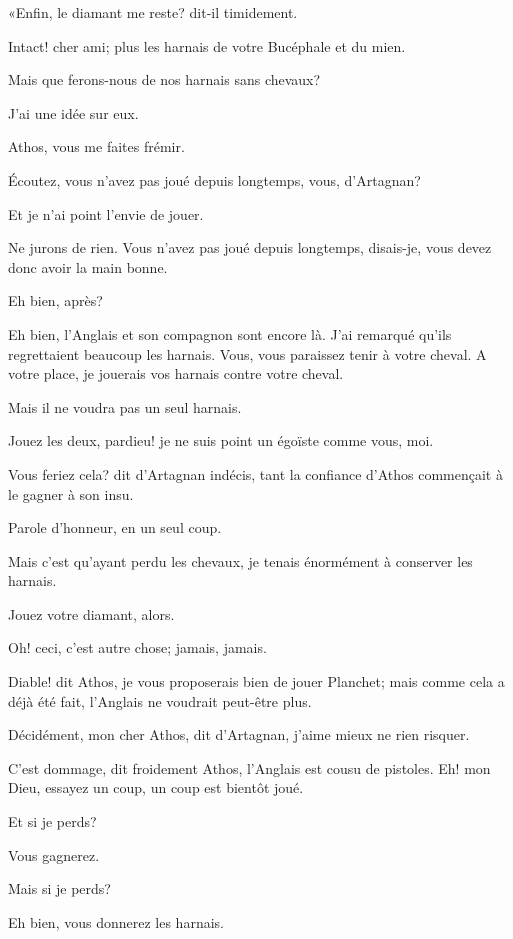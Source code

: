 «Enfin, le diamant me reste? dit-il timidement. 

\speak  Intact! cher ami; plus les harnais de votre Bucéphale et du mien. 

\speak  Mais que ferons-nous de nos harnais sans chevaux? 

\speak  J'ai une idée sur eux. 

\speak  Athos, vous me faites frémir. 

\speak  Écoutez, vous n'avez pas joué depuis longtemps, vous, d'Artagnan? 

\speak  Et je n'ai point l'envie de jouer. 

\speak  Ne jurons de rien. Vous n'avez pas joué depuis longtemps, disais-je, vous devez donc avoir la main bonne. 

\speak  Eh bien, après? 

\speak  Eh bien, l'Anglais et son compagnon sont encore là. J'ai remarqué qu'ils regrettaient beaucoup les harnais. Vous, vous paraissez tenir à votre cheval. A votre place, je jouerais vos harnais contre votre cheval. 

\speak  Mais il ne voudra pas un seul harnais. 

\speak  Jouez les deux, pardieu! je ne suis point un égoïste comme vous, moi. 

\speak  Vous feriez cela? dit d'Artagnan indécis, tant la confiance d'Athos commençait à le gagner à son insu. 

\speak  Parole d'honneur, en un seul coup. 

\speak  Mais c'est qu'ayant perdu les chevaux, je tenais énormément à conserver les harnais. 

\speak  Jouez votre diamant, alors. 

\speak  Oh! ceci, c'est autre chose; jamais, jamais. 

\speak  Diable! dit Athos, je vous proposerais bien de jouer Planchet; mais comme cela a déjà été fait, l'Anglais ne voudrait peut-être plus. 

\speak  Décidément, mon cher Athos, dit d'Artagnan, j'aime mieux ne rien risquer. 

\speak  C'est dommage, dit froidement Athos, l'Anglais est cousu de pistoles. Eh! mon Dieu, essayez un coup, un coup est bientôt joué. 

\speak  Et si je perds? 

\speak  Vous gagnerez. 

\speak  Mais si je perds? 

\speak  Eh bien, vous donnerez les harnais. 

